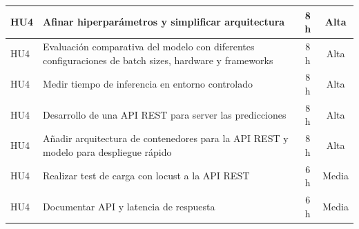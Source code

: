 \documentclass[
11pt, %
]{charter}
\begin{document}
\begin{table}[htpb]
\begin{tabularx}{\linewidth}{@{}|X|X|c|c|@{}}
HU4 & Afinar hiperparámetros y simplificar arquitectura					 & 8 h & Alta \\ \hline
HU4 & Evaluación comparativa del modelo con diferentes configuraciones de batch sizes, hardware y frameworks				 & 8 h & Alta \\ \hline
HU4 & Medir tiempo de inferencia en entorno controlado					 & 8 h & Alta \\ \hline
HU4 & Desarrollo de una API REST para server las predicciones 					 & 8 h & Alta \\ \hline
HU4 & Añadir arquitectura de contenedores para la API REST y modelo para despliegue rápido	 					 & 8 h & Alta \\ \hline
HU4 & Realizar test de carga con locust a la API REST  					 & 6 h & Media \\ \hline
HU4 & Documentar API y latencia de respuesta	  					 & 6 h & Media \\ \hline



\end{tabularx}
\end{table}
\end{document}
